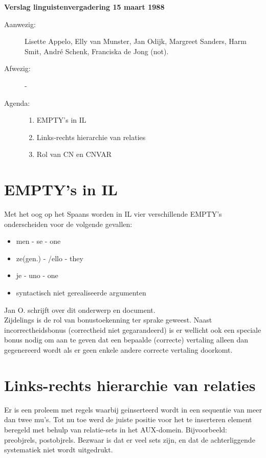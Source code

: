 
   \RosDate{\today}
   \MakeRosTitle
%
%

\noindent
{\bf Verslag linguistenvergadering 15 maart 1988}
\begin{description}
\item[Aanwezig:] Lisette Appelo, Elly van Munster, Jan Odijk, Margreet Sanders,
Harm Smit, Andr\'{e} Schenk, Franciska de Jong (not).
\item[Afwezig:] -
\item[Agenda:] \mbox{}
\begin{enumerate}
\item EMPTY's in IL
\item Links-rechts hierarchie van relaties
\item Rol van CN en CNVAR
\end{enumerate}
\end{description}


\section{EMPTY's in IL} 
 Met het oog op het Spaans worden in IL vier 
verschillende EMPTY's onderscheiden 
voor de volgende gevallen:
 \begin{itemize}
  \item men - se - one
  \item ze(gen.)  - \emptyset/ello - they
  \item je - uno - one
  \item syntactisch niet gerealiseerde argumenten
\end{itemize}
Jan O. schrijft over dit onderwerp en document.\\

Zijdelings  is de rol van bonustoekenning ter sprake geweest. 
Naast incorrectheidsbonus (correctheid niet gegarandeerd) is er wellicht ook
een speciale bonus nodig 
om aan te geven dat een bepaalde (correcte) vertaling alleen 
dan gegenereerd wordt als er geen enkele andere correcte vertaling doorkomt.

\section{Links-rechts hierarchie van relaties}
Er is een proleem met regels waarbij geinserteerd wordt 
in een sequentie van meer dan 
twee mu's. Tot nu toe werd de juiste  positie voor het te inserteren element 
beregeld met behulp van relatie-sets in het AUX-domein. Bijvoorbeeld: 
preobjrels, postobjrels. Bezwaar is dat er veel sets zijn, en dat de 
achterliggende systematiek niet wordt uitgedrukt.

